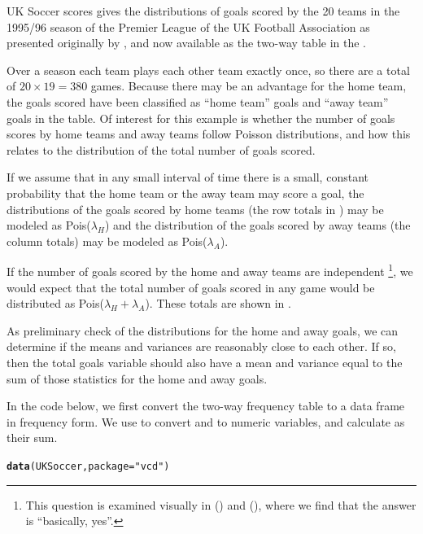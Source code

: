\documentclass[11pt]{book}\usepackage[]{graphicx}\usepackage[]{color}
\makeatletter
\newcommand{\hlstr}[1]{\textcolor[rgb]{0.192,0.494,0.8}{#1}}%
\newcommand{\hlstd}[1]{\textcolor[rgb]{0.345,0.345,0.345}{#1}}%
\newcommand{\hlkwc}[1]{\textcolor[rgb]{0.333,0.667,0.333}{#1}}%
\newcommand{\hlkwd}[1]{\textcolor[rgb]{0.737,0.353,0.396}{\textbf{#1}}}%
\newenvironment{kframe}{%
 \def\at@end@of@kframe{}%
 \ifinner\ifhmode%
  \def\at@end@of@kframe{\end{minipage}}%
  \begin{minipage}{\columnwidth}%
 \fi\fi%
 \def\FrameCommand##1{\hskip\@totalleftmargin \hskip-\fboxsep
 \colorbox{shadecolor}{##1}\hskip-\fboxsep
     \hskip-\linewidth \hskip-\@totalleftmargin \hskip\columnwidth}%
 \MakeFramed {\advance\hsize-\width
   \@totalleftmargin\z@ \linewidth\hsize
   \@setminipage}}%
 {\par\unskip\endMakeFramed%
 \at@end@of@kframe}
\newenvironment{knitrout}{}{} %
\renewenvironment{knitrout}{\small\renewcommand{\baselinestretch}{.85}}{} %
\makeatother
\begin{document}
\begin{Example}[soccer]{UK Soccer scores}
  gives the distributions of goals scored by
the 20 teams in the  1995/96 season of the
 Premier League of the UK Football Association
as presented originally by 
\citet{Lee:97}, and now available as the two-way table 
in the .

Over a season
each team plays each other team exactly once, so there are a total of
$20 \times 19 = 380$ games.
Because there may be an advantage for the home team,
the goals scored have been classified as ``home team'' goals
and ``away team'' goals in the table. Of interest for this example is whether
the number of goals scores by home teams and away teams follow
Poisson distributions, and how this relates to the distribution of the 
total number of goals scored.

If we assume that in any small interval of time there is a small, constant
probability that the home team or the away team may score a goal,
the distributions of the goals scored by home teams
(the row totals in )
may be modeled as Pois($\lambda_H$) and the distribution of
the goals scored by away teams (the column totals)
may be modeled as Pois($\lambda_A$).

If the number of goals scored by the home and away teams are independent%
\footnote{This question
is examined visually in  ()
and  (), where we find that the answer
is ``basically, yes''.},
we would expect that the total number of goals scored in any
game would be distributed as Pois($\lambda_H + \lambda_A$).
These totals are shown in .


As preliminary check of the distributions for the home and away goals,
we can determine if the means and variances are reasonably close
to each other.
If so, then the total goals variable should also have a mean and variance
equal to the sum of those statistics for the home and away goals.

In the \R code below, we first convert the two-way frequency table
 to a data frame in frequency form.
We use  to convert  and  to
numeric variables, and calculate  as their sum.

\begin{knitrout}
\color{fgcolor}\begin{kframe}
\begin{alltt}
\hlkwd{data}\hlstd{(UKSoccer,} \hlkwc{package}\hlstd{=}\hlstr{"vcd"}\hlstd{)}


\end{alltt}
\end{kframe}
\end{knitrout}
\end{Example}
\end{document}
